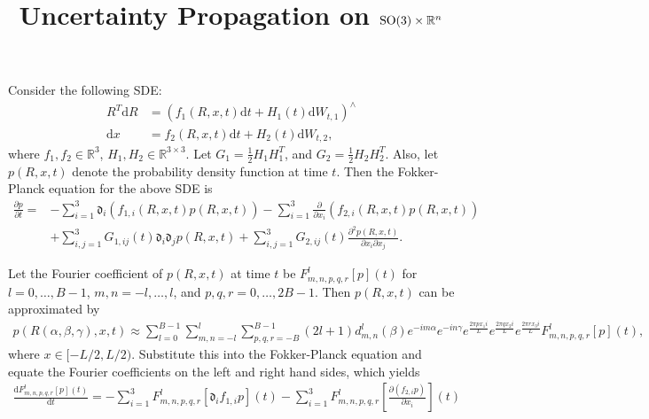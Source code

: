 \documentclass[10pt]{article}
\title{\vspace{-4ex}\textbf{Uncertainty Propagation on $\SO\times\real^n$\vspace{-4ex}}}
\date{}
\newcommand{\diff}[1]{\mathrm{d}#1}
\newcommand{\liediff}{\mathfrak{d}}
\newcommand{\real}{\ensuremath{\mathbb{R}}}
\begin{document}
\maketitle

Consider the following SDE:
\begin{align*}
	R^T\diff{R} &= (f_1(R,x,t)\diff{t} + H_1(t)\diff{W}_{t,1})^\wedge \\
	\diff{x} &= f_2(R,x,t)\diff{t} + H_2(t)\diff{W}_{t,2},
\end{align*}
where $f_1,f_2\in\real^3$, $H_1,H_2\in\real^{3\times 3}$.
Let $G_1=\frac{1}{2}H_1H_1^T$, and $G_2=\frac{1}{2}H_2H_2^T$.
Also, let $p(R,x,t)$ denote the probability density function at time $t$.
Then the Fokker-Planck equation for the above SDE is
\begin{align*}
	\frac{\partial p}{\partial t} = &-\sum_{i=1}^3 \liediff_i(f_{1,i}(R,x,t)p(R,x,t)) - \sum_{i=1}^3 \frac{\partial }{\partial x_i} (f_{2,i}(R,x,t)p(R,x,t)) \\
	&+ \sum_{i,j=1}^3 G_{1,ij}(t) \liediff_i\liediff_j p(R,x,t) + \sum_{i,j=1}^3 G_{2,ij}(t) \frac{\partial^2 p(R,x,t)}{\partial x_i \partial x_j}.
\end{align*}

Let the Fourier coefficient of $p(R,x,t)$ at time $t$ be $F^l_{m,n,p,q,r}[p](t)$ for $l = 0,\ldots,B-1$, $m,n = -l,\ldots,l$, and $p,q,r = 0,\ldots,2B-1$.
Then $p(R,x,t)$ can be approximated by
\begin{align*}
	p(R(\alpha,\beta,\gamma),x,t) \approx \sum_{l=0}^{B-1} \sum_{m,n=-l}^l \sum_{p,q,r=-B}^{B-1} (2l+1)d_{m,n}^l(\beta) e^{-im\alpha} e^{-in\gamma} e^{\frac{2\pi px_1 i}{L}} e^{\frac{2\pi qx_2 i}{L}} e^{\frac{2\pi rx_3 i}{L}} F^l_{m,n,p,q,r}[p](t),
\end{align*}
where $x\in[-L/2,L/2)$.
Substitute this into the Fokker-Planck equation and equate the Fourier coefficients on the left and right hand sides, which yields
\begin{align*}
	\frac{\diff{F^{l}_{m,n,p,q,r}[p](t)}}{\diff{t}} = -\sum_{i=1}^3 F^l_{m,n,p,q,r}[\liediff_if_{1,i}p](t) - \sum_{i=1}^3 F^l_{m,n,p,q,r}\left[ \frac{\partial (f_{2,i}p)}{\partial x_i} \right](t)
\end{align*}
\end{document}
